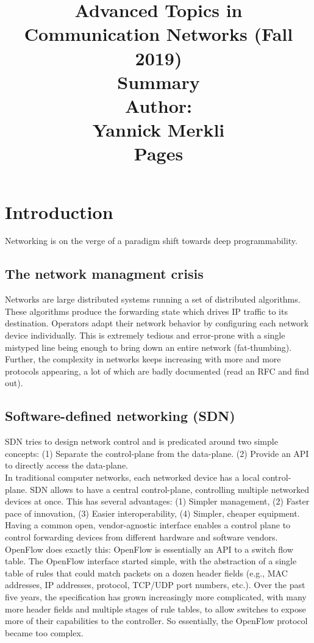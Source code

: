 \documentclass[11pt,oneside,a4paper]{article}
\title{
    \vspace*{0.0mm}
    \LARGE\bf\sf Advanced Topics in \\Communication Networks (Fall 2019)
    \vspace*{10.0mm} \\
    \Huge\bf\sf Summary
    \vspace*{30.0mm} \\
    \normalsize
    \sf Author:\\[5pt]
    \sf Yannick Merkli\\ [5pt]
    \sf \pageref{lastpage} Pages
}
\date{}
\begin{document}
\maketitle
\thispagestyle{empty}
\raggedbottom
\clearpage


\clearpage
\setcounter{tocdepth}{2}
\tableofcontents
\clearpage
{}

\section{Introduction}

Networking is on the verge of a paradigm shift towards deep programmability.

\subsection{The network managment crisis}
Networks are large distributed systems running a set of distributed algorithms. These algorithms produce the forwarding state which drives IP traffic to its destination. Operators adapt their network behavior by configuring each network device individually. This is extremely tedious and error-prone with a single mistyped line being enough to bring down an entire network (fat-thumbing). Further, the complexity in networks keeps increasing with more and more protocols appearing, a lot of which are badly documented (read an RFC and find out).

\subsection{Software-defined networking (SDN)}

SDN tries to design network control and is predicated around two simple concepts: (1) Separate the control-plane from the data-plane. (2) Provide an API to directly access the data-plane.\\
In traditional computer networks, each networked device has a local control-plane. SDN allows to have a central control-plane, controlling multiple networked devices at once. This has several advantages: (1) Simpler management, (2) Faster pace of innovation, (3) Easier interoperability, (4) Simpler, cheaper equipment. Having a common open, vendor-agnostic interface enables a control plane to control forwarding devices from different hardware and software vendors. OpenFlow does exactly this: OpenFlow is essentially an API to a switch flow table. The OpenFlow interface started simple, with the abstraction of a single table of rules that could match packets on a dozen header fields (e.g., MAC addresses, IP addresses, protocol, TCP/UDP port numbers, etc.). Over the past five years, the specification has grown increasingly more complicated, with many more header fields and multiple stages of rule tables, to allow switches to expose more of their capabilities to the controller. So essentially, the OpenFlow protocol became too complex.
\end{document}
